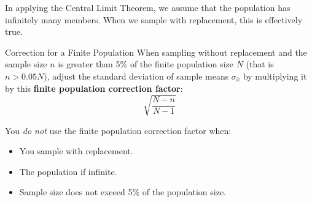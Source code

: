\documentclass{beamer}
\begin{document}
\begin{frame}
\begin{note}
In applying the Central Limit Theorem, we assume that the population has infinitely many members. When we sample with replacement, this is effectively true.
\end{note}\pause

\begin{block}{Correction for a Finite Population}
When sampling without replacement and the sample size $n$ is greater than 5\% of the finite population size $N$ (that is $n> 0.05N$), adjust the standard deviation of sample means $\sigma_{\bar{x}}$ by multiplying it by this \textbf{finite population correction factor}:
\vspace{-2mm}
\begin{equation*}
\sqrt{\dfrac{N-n}{N-1}}
\end{equation*}
\end{block}\pause

\begin{note}
You \emph{do not} use the finite population correction factor when:
\begin{itemize}
\item You sample with replacement.
\item The population if infinite.
\item Sample size does not exceed 5\% of the population size.
\end{itemize}
\end{note}
\end{frame}
\end{document}
